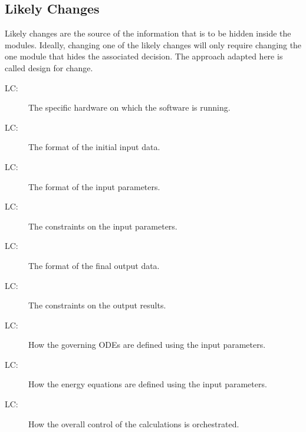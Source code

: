 \documentclass[12pt]{article}
\newcounter{lcnum}
\newcommand{\lcthelcnum}{LC\thelcnum}
\begin{document}
\subsection{Likely Changes}
\label{Sec:LikeChan}
Likely changes are the source of the information that is to be hidden inside the modules. Ideally, changing one of the likely changes will only require changing the one module that hides the associated decision. The approach adapted here is called design for change.
\begin{description}
\item[\lcthelcnum\label{LChardware}:]The specific hardware on which the software is running.
\end{description}
\begin{description}
\item[\lcthelcnum\label{LCinput}:]The format of the initial input data.
\end{description}
\begin{description}
\item[\lcthelcnum\label{LCparameters}:]The format of the input parameters.
\end{description}
\begin{description}
\item[\lcthelcnum\label{LCinputverification}:]The constraints on the input parameters.
\end{description}
\begin{description}
\item[\lcthelcnum\label{LCoutput}:]The format of the final output data.
\end{description}
\begin{description}
\item[\lcthelcnum\label{LCoutputverification}:]The constraints on the output results.
\end{description}
\begin{description}
\item[\lcthelcnum\label{LCtemp}:]How the governing ODEs are defined using the input parameters.
\end{description}
\begin{description}
\item[\lcthelcnum\label{LCenergy}:]How the energy equations are defined using the input parameters.
\end{description}
\begin{description}
\item[\lcthelcnum\label{LCcontrol}:]How the overall control of the calculations is orchestrated.
\end{description}
\end{document}
